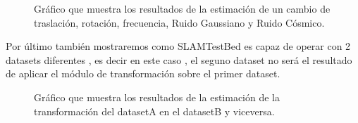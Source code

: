 \begin{figure}[H]
\begin{center}
\hspace{0.5cm}

\end{center}

\caption{Gráfico que muestra los resultados de la estimación de un cambio de traslación, rotación, frecuencia, Ruido Gaussiano y Ruido Cósmico.}
\end{figure}


Por último también mostraremos como SLAMTestBed es capaz de operar con 2 datasets diferentes , es decir en este caso , el seguno dataset no será el resultado de aplicar el módulo de transformación sobre el primer dataset.

\begin{figure}[H]
\begin{center}
\hspace{0.5cm}

\end{center}

\caption{Gráfico que muestra los resultados de la estimación de la transformación del datasetA en el datasetB y viceversa.}
\end{figure}



